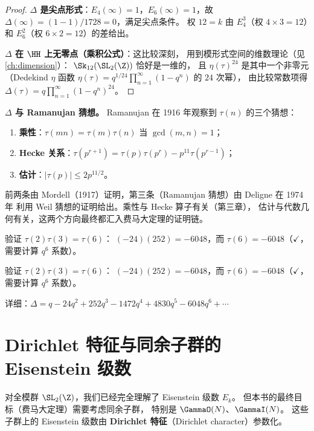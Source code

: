 \begin{proof}
\textbf{$\Delta$ 是尖点形式}：$E_4(\infty) = 1$，$E_6(\infty) = 1$，故
$\Delta(\infty) = (1 - 1)/1728 = 0$，满足尖点条件。
权 $12 = k$ 由 $E_4^3$（权 $4 \times 3 = 12$）和 $E_6^2$（权 $6 \times 2 = 12$）的差给出。

\textbf{$\Delta$ 在 $\HH$ 上无零点（乘积公式）}：这比较深刻，
用到模形式空间的维数理论（见\cref{ch:dimension}）：
$\Sk_{12}(\SL_2(\Z))$ 恰好是一维的，
且 $\eta(\tau)^{24}$ 是其中一个非零元（Dedekind $\eta$ 函数
$\eta(\tau) = q^{1/24}\prod_{n=1}^\infty(1-q^n)$ 的 $24$ 次幂），
由比较常数项得 $\Delta(\tau) = q\prod_{n=1}^\infty(1-q^n)^{24}$。
\end{proof}

\textbf{$\Delta$ 与 Ramanujan 猜想。}
Ramanujan 在 1916 年观察到 $\tau(n)$ 的三个猜想：
\begin{enumerate}
  \item \textbf{乘性}：$\tau(mn) = \tau(m)\tau(n)$ 当 $\gcd(m,n) = 1$；
  \item \textbf{Hecke 关系}：$\tau(p^{r+1}) = \tau(p)\tau(p^r) - p^{11}\tau(p^{r-1})$；
  \item \textbf{估计}：$|\tau(p)| \leq 2p^{11/2}$。
\end{enumerate}
前两条由 Mordell（1917）证明，第三条（Ramanujan 猜想）由 Deligne 在 1974 年
利用 Weil 猜想的证明给出。乘性与 Hecke 算子有关（第三章），
估计与代数几何有关，这两个方向最终都汇入费马大定理的证明链。

\begin{example}
\label{ex:tau-multiplicative}
验证 $\tau(2)\tau(3) = \tau(6)$：
$(-24)(252) = -6048$，而 $\tau(6) = -6048$（$\checkmark$，需要计算 $q^6$ 系数）。

验证 $\tau(2)\tau(3) = \tau(6)$：
$(-24)(252) = -6048$，而 $\tau(6) = -6048$（$\checkmark$，需要计算 $q^6$ 系数）。

详细：$\Delta = q - 24q^2 + 252q^3 - 1472q^4 + 4830q^5 - 6048q^6 + \cdots$
\end{example}


\section{Dirichlet 特征与同余子群的 Eisenstein 级数}
\label{sec:eisenstein-congruence}

对全模群 $\SL_2(\Z)$，我们已经完全理解了 Eisenstein 级数 $E_k$。
但本书的最终目标（费马大定理）需要考虑同余子群，
特别是 $\GammaO(N)$、$\GammaI(N)$。
这些子群上的 Eisenstein 级数由 \textbf{Dirichlet 特征}（Dirichlet character）参数化。

